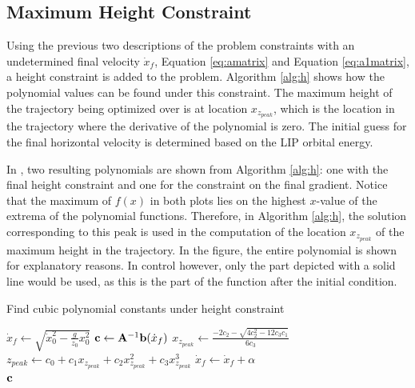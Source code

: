 \subsection{Maximum Height Constraint}
Using the previous two descriptions of the problem constraints with an undetermined final velocity $\dot{x}_f$, Equation \eqref{eq:amatrix} and Equation \eqref{eq:a1matrix}, a height constraint is added to the problem. Algorithm \ref{alg:h} shows how the polynomial values can be found under this constraint. The maximum height of the trajectory being optimized over is at location $x_{z_{peak}}$, which is the location in the trajectory where the derivative of the polynomial is zero. The initial guess for the final horizontal velocity is determined based on the \ac{LIP} orbital energy. 

In , two resulting polynomials are shown from Algorithm \ref{alg:h}: one with the final height constraint and one for the constraint on the final gradient. Notice that the maximum of $f(x)$ in both plots lies on the highest $x$-value of the extrema of the polynomial functions. Therefore, in Algorithm \ref{alg:h}, the solution corresponding to this peak is used in the computation of the location $x_{z_{peak}}$ of the maximum height in the trajectory. In the figure, the entire polynomial is shown for explanatory reasons. In control however, only the part depicted with a solid line would be used, as this is the part of the function after the initial condition.
\begin{algorithm}
\caption{Find cubic polynomial constants under height constraint}
\label{alg:h}
\begin{algorithmic}[1]
    \State $\dot{x}_{f}\gets \sqrt{\dot{x}_0^2-\frac{g}{z_0}x_0^2}$
        \Repeat
            \State $\mathbf{c}\gets \mathbf{A}^{-1}\mathbf{b}(\dot{x}_{f})$ 
            \State $x_{z_{peak}}\gets \frac{-2c_2 - \sqrt{4c_2^2-12c_3c_1}}{6c_3}$ 
            \State $z_{peak} \gets c_0 + c_1x_{z_{peak}} + c_2x_{z_{peak}}^2+ c_3x_{z_{peak}}^3$ 
            \State $\dot{x}_{f} \gets \dot{x}_{f}+\alpha$   
        \\
    \Return $\mathbf{c}$
\end{algorithmic}
\end{algorithm}
